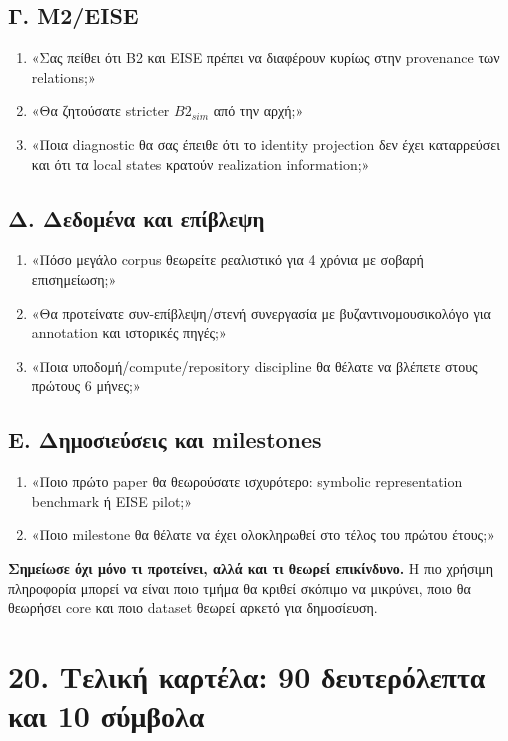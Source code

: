 \documentclass[9pt,a4paper]{extarticle}
\begin{document}
\subsection*{Γ. M2/EISE}
\begin{enumerate}
\item «Σας πείθει ότι B2 και EISE πρέπει να διαφέρουν κυρίως στην provenance των relations;»
\item «Θα ζητούσατε stricter \(B2_{sim}\) από την αρχή;»
\item «Ποια diagnostic θα σας έπειθε ότι το identity projection δεν έχει καταρρεύσει και ότι τα local states κρατούν realization information;»
\end{enumerate}

\subsection*{Δ. Δεδομένα και επίβλεψη}
\begin{enumerate}
\item «Πόσο μεγάλο corpus θεωρείτε ρεαλιστικό για 4 χρόνια με σοβαρή επισημείωση;»
\item «Θα προτείνατε συν-επίβλεψη/στενή συνεργασία με βυζαντινομουσικολόγο για annotation και ιστορικές πηγές;»
\item «Ποια υποδομή/compute/repository discipline θα θέλατε να βλέπετε στους πρώτους 6 μήνες;»
\end{enumerate}

\subsection*{Ε. Δημοσιεύσεις και milestones}
\begin{enumerate}
\item «Ποιο πρώτο paper θα θεωρούσατε ισχυρότερο: symbolic representation benchmark ή EISE pilot;»
\item «Ποιο milestone θα θέλατε να έχει ολοκληρωθεί στο τέλος του πρώτου έτους;»
\end{enumerate}

\begin{warnbox}
\textbf{Σημείωσε όχι μόνο τι προτείνει, αλλά και τι θεωρεί επικίνδυνο.} Η πιο χρήσιμη πληροφορία μπορεί να είναι ποιο τμήμα θα κριθεί σκόπιμο να μικρύνει, ποιο θα θεωρήσει core και ποιο dataset θεωρεί αρκετό για δημοσίευση.
\end{warnbox}

\newpage
\section*{20. Τελική καρτέλα: 90 δευτερόλεπτα και 10 σύμβολα}
\end{document}
